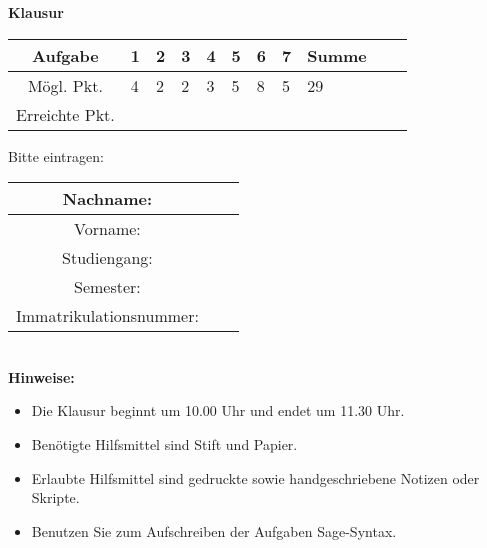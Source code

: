 \begin{center}
\Huge \textbf{Klausur}
\end{center}
\bigskip\bigskip\bigskip
\Large
\begin{center}
\begin{tabular}{|Sl||p{0.5cm}|p{0.5cm}|p{0.5cm}|p{0.5cm}|p{0.5cm}|p{0.5cm}|p{0.5cm}||Sc|}
\hline
Aufgabe & \textbf{1} & \textbf{2} & \textbf{3} & \textbf{4} & \textbf{5} & \textbf{6} & \textbf{7} & \textbf{Summe}\\
\hline
Mögl. Pkt. &  4  & 2  & 2  & 3  & 5  & 8  & 5  &  29  \\
\hline
Erreichte Pkt. &    &   &   &   &   &   &     &    \\
\hline
\end{tabular}
\end{center}

\bigskip\bigskip\bigskip
Bitte eintragen:\\
\begin{center}
\begin{tabular}{|Sl|p{8cm}|}
\hline
Nachname: & \\
\hline
Vorname: & \\
\hline
Studiengang: & \\
\hline 
Semester: & \\
\hline 
Immatrikulationsnummer: & \\
\hline
\end{tabular}\\[1cm]
\textbf{Hinweise:}
\begin{itemize}
\item Die Klausur beginnt um 10.00 Uhr und endet um 11.30 Uhr.
\item Ben\"otigte Hilfsmittel sind Stift und Papier.
\item Erlaubte Hilfsmittel sind gedruckte sowie handgeschriebene Notizen oder Skripte. 
\item Benutzen Sie zum Aufschreiben der Aufgaben Sage-Syntax.
\end{itemize}
\end{center}

\newpage
\normalsize
